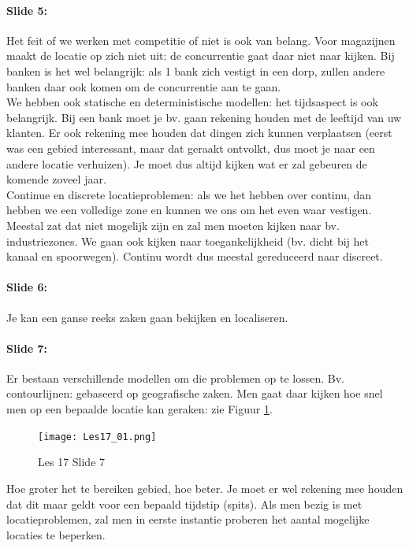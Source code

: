 \documentclass[10pt,a4paper]{report}
\begin{document}
\paragraph{Slide 5:} Het feit of we werken met competitie of niet is ook van belang. Voor magazijnen maakt de locatie op zich niet uit: de concurrentie gaat daar niet naar kijken. Bij banken is het wel belangrijk: als 1 bank zich vestigt in een dorp, zullen andere banken daar ook komen om de concurrentie aan te gaan.\\
We hebben ook statische en deterministische modellen: het tijdsaspect is ook belangrijk. Bij een bank moet je bv. gaan rekening houden met de leeftijd van uw klanten. Er ook rekening mee houden dat dingen zich kunnen verplaatsen (eerst was een gebied interessant, maar dat geraakt ontvolkt, dus moet je naar een andere locatie verhuizen). Je moet dus altijd kijken wat er zal gebeuren de komende zoveel jaar.\\
Continue en discrete locatieproblemen: als we het hebben over continu, dan hebben we een volledige zone en kunnen we ons om het even waar vestigen. Meestal zat dat niet mogelijk zijn en zal men moeten kijken naar bv. industriezones. We gaan ook kijken naar toegankelijkheid (bv. dicht bij het kanaal en spoorwegen). Continu wordt dus meestal gereduceerd naar discreet.

\paragraph{Slide 6:} Je kan een ganse reeks zaken gaan bekijken en localiseren.

\paragraph{Slide 7:} Er bestaan verschillende modellen om die problemen op te lossen. Bv. contourlijnen: gebaseerd op geografische zaken. Men gaat daar kijken hoe snel men op een bepaalde locatie kan geraken: zie Figuur \ref{les17_01}.\\

\begin{figure}[h!]
\centering
\texttt{[image: Les17\_01.png]}
\caption{Les 17 Slide 7} 
\label{les17_01}
\end{figure}

Hoe groter het te bereiken gebied, hoe beter. Je moet er wel rekening mee houden dat dit maar geldt voor een bepaald tijdstip (spits). Als men bezig is met locatieproblemen, zal men in eerste instantie proberen het aantal mogelijke locaties te beperken.
\end{document}
